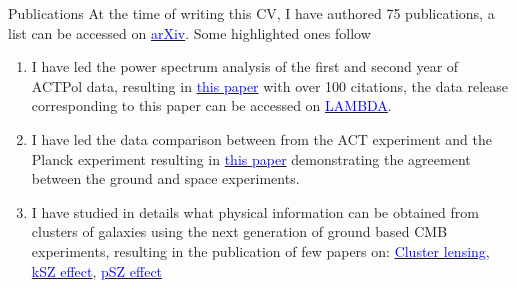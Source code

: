 \documentclass{resume} %
\newcommand{\TIB}[1]{\textcolor{blue}{#1}}
\begin{document}
\begin{rSection}{Publications}
At the time of writing this CV, I have authored 75 publications, a list can be accessed on \href{https://arxiv.org/search/astro-ph?searchtype=author&query=Louis\%2C+T}{\TIB{arXiv}}. Some highlighted ones follow
\begin{enumerate}
\item I have led the power spectrum analysis of the first and second year of ACTPol data, resulting in \href{https://ui.adsabs.harvard.edu/abs/2017JCAP...06..031L}{\TIB{this paper}} with over 100 citations, the data release corresponding to this paper can be accessed on \href{https://lambda.gsfc.nasa.gov/product/act/actpol_prod_table.cfm}{\TIB{LAMBDA}}.
\item I have led the data comparison between from the ACT experiment and the Planck experiment resulting in \href{https://ui.adsabs.harvard.edu/abs/2014JCAP...07..016L}{\TIB{this paper}} demonstrating the agreement between the ground and space experiments.
\item I have studied in details what physical information can be obtained from clusters of galaxies using the next generation of ground based CMB experiments, resulting in the publication of few papers on: \href{https://ui.adsabs.harvard.edu/abs/2017PhRvD..95d3517L}{ \TIB{Cluster lensing}},  \href{https://ui.adsabs.harvard.edu/abs/2016PhRvD..94d3522A}{ \TIB{kSZ effect}}, \href{https://journals.aps.org/prd/abstract/10.1103/PhysRevD.96.123509}{\TIB{pSZ effect}} \\

\end{enumerate}



\end{rSection}

\vspace{2cm}
\end{document}
